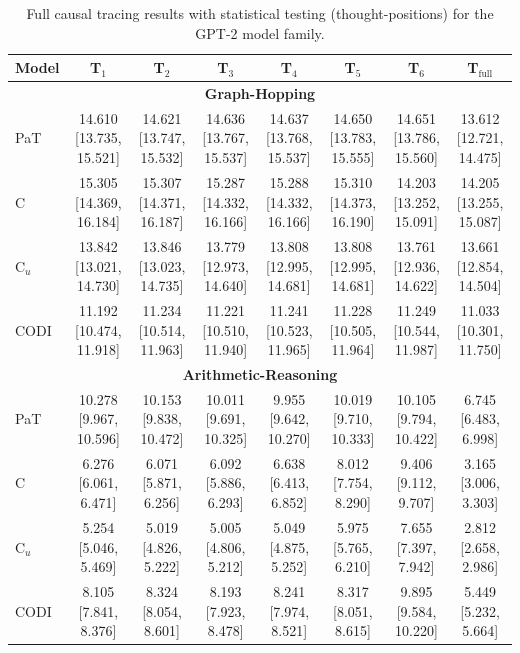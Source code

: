 \begin{table}[h!]
\centering
\tiny
\setlength{\tabcolsep}{2.5pt}
\begin{tabular}{l ccccccc}
\toprule
Model & T$_1$ & T$_2$ & T$_3$ & T$_4$ & T$_5$ & T$_6$ & T$_{\text{full}}$ \\
\midrule
\multicolumn{8}{c}{\textbf{Graph-Hopping}} \\
\midrule
PaT & 14.610 [13.735, 15.521] & 14.621 [13.747, 15.532] & 14.636 [13.767, 15.537] & 14.637 [13.768, 15.537] & 14.650 [13.783, 15.555] & 14.651 [13.786, 15.560] & 13.612 [12.721, 14.475] \\
C & 15.305 [14.369, 16.184] & 15.307 [14.371, 16.187] & 15.287 [14.332, 16.166] & 15.288 [14.332, 16.166] & 15.310 [14.373, 16.190] & 14.203 [13.252, 15.091] & 14.205 [13.255, 15.087] \\
C$_u$ & 13.842 [13.021, 14.730] & 13.846 [13.023, 14.735] & 13.779 [12.973, 14.640] & 13.808 [12.995, 14.681] & 13.808 [12.995, 14.681] & 13.761 [12.936, 14.622] & 13.661 [12.854, 14.504] \\
CODI & 11.192 [10.474, 11.918] & 11.234 [10.514, 11.963] & 11.221 [10.510, 11.940] & 11.241 [10.523, 11.965] & 11.228 [10.505, 11.964] & 11.249 [10.544, 11.987] & 11.033 [10.301, 11.750] \\
\midrule
\multicolumn{8}{c}{\textbf{Arithmetic-Reasoning}} \\
\midrule
PaT & 10.278 [9.967, 10.596] & 10.153 [9.838, 10.472] & 10.011 [9.691, 10.325] & 9.955 [9.642, 10.270] & 10.019 [9.710, 10.333] & 10.105 [9.794, 10.422] & 6.745 [6.483, 6.998] \\
C & 6.276 [6.061, 6.471] & 6.071 [5.871, 6.256] & 6.092 [5.886, 6.293] & 6.638 [6.413, 6.852] & 8.012 [7.754, 8.290] & 9.406 [9.112, 9.707] & 3.165 [3.006, 3.303] \\
C$_u$ & 5.254 [5.046, 5.469] & 5.019 [4.826, 5.222] & 5.005 [4.806, 5.212] & 5.049 [4.875, 5.252] & 5.975 [5.765, 6.210] & 7.655 [7.397, 7.942] & 2.812 [2.658, 2.986] \\
CODI & 8.105 [7.841, 8.376] & 8.324 [8.054, 8.601] & 8.193 [7.923, 8.478] & 8.241 [7.974, 8.521] & 8.317 [8.051, 8.615] & 9.895 [9.584, 10.220] & 5.449 [5.232, 5.664] \\
\bottomrule
\end{tabular}
\caption{Full causal tracing results with statistical testing (thought-positions) for the GPT-2 model family.}
\label{tab:causal_trace_thought_gpt2}
\end{table}
